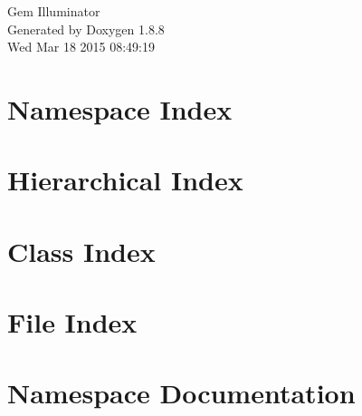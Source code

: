 \documentclass[twoside]{book}
\newcommand{\+}{\discretionary{\mbox{\scriptsize$\hookleftarrow$}}{}{}}
\newcommand{\clearemptydoublepage}{%
  \newpage{\pagestyle{empty}\cleardoublepage}%
}
\begin{document}
\hypersetup{pageanchor=false,
             bookmarks=true,
             bookmarksnumbered=true,
             pdfencoding=unicode
            }
\begin{titlepage}
\vspace*{7cm}
\begin{center}%
{\Large Gem Illuminator }\\
\vspace*{1cm}
{\large Generated by Doxygen 1.8.8}\\
\vspace*{0.5cm}
{\small Wed Mar 18 2015 08:49:19}\\
\end{center}
\end{titlepage}
\clearemptydoublepage
\tableofcontents
\clearemptydoublepage
{}
\hypersetup{pageanchor=true}

\chapter{Namespace Index}

\chapter{Hierarchical Index}

\chapter{Class Index}

\chapter{File Index}

\chapter{Namespace Documentation}





\end{document}
